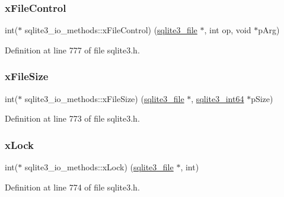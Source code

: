 \subsubsection{\texorpdfstring{x\+File\+Control}{xFileControl}}
{\footnotesize\ttfamily int($\ast$ sqlite3\+\_\+io\+\_\+methods\+::x\+File\+Control) (\mbox{\hyperlink{structsqlite3__file}{sqlite3\+\_\+file}} $\ast$, int op, void $\ast$p\+Arg)}



Definition at line 777 of file sqlite3.\+h.

\mbox{\label{structsqlite3__io__methods_ae875f158de72435f40ca0bd5207d9862}} 
\subsubsection{\texorpdfstring{x\+File\+Size}{xFileSize}}
{\footnotesize\ttfamily int($\ast$ sqlite3\+\_\+io\+\_\+methods\+::x\+File\+Size) (\mbox{\hyperlink{structsqlite3__file}{sqlite3\+\_\+file}} $\ast$, \mbox{\hyperlink{sqlite3_8h_a0a4d3e6c1ad46f90e746b920ab6ca0d2}{sqlite3\+\_\+int64}} $\ast$p\+Size)}



Definition at line 773 of file sqlite3.\+h.

\mbox{\label{structsqlite3__io__methods_ac88793475b0c4188fb02c229f1a11e8b}} 
\subsubsection{\texorpdfstring{x\+Lock}{xLock}}
{\footnotesize\ttfamily int($\ast$ sqlite3\+\_\+io\+\_\+methods\+::x\+Lock) (\mbox{\hyperlink{structsqlite3__file}{sqlite3\+\_\+file}} $\ast$, int)}



Definition at line 774 of file sqlite3.\+h.

\mbox{\label{structsqlite3__io__methods_ac1433ffc0da0414a2a67a46d338d83eb}} 
